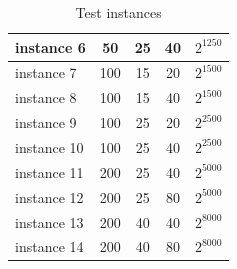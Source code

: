 \documentclass[10pt,journal,compsoc]{IEEEtran}
\newcommand\Tstrut{\rule{0pt}{2.6ex}}
\begin{document}
\begin{table}[h]
{\begin{tabular}{l|c|c|c|c}
instance 6  & 50                                                                             & 25                                                                                        & 40 & $2^{1250}$ \Tstrut                                                                                  \\ \hline
instance 7  & 100                                                                            & 15                                                                                        & 20 & $2^{1500}$  \Tstrut                                                                                \\ \hline
instance 8  & 100                                                                            & 15                                                                                        & 40& $2^{1500}$  \Tstrut                                                                                \\ \hline
instance 9  & 100                                                                            & 25                                                                                        & 20 & $2^{2500}$ \Tstrut                                                                                 \\ \hline
instance 10 & 100                                                                            & 25                                                                                        & 40 & $2^{2500}$  \Tstrut                                                                                \\ \hline
instance 11 & 200                                                                            & 25                                                                                        & 40 & $2^{5000}$  \Tstrut                                                                                \\ \hline
instance 12 & 200                                                                            & 25                                                                                        & 80& $2^{5000}$    \Tstrut                                                                              \\ \hline
instance 13 & 200                                                                            & 40                                                                                        & 40& $2^{8000}$   \Tstrut                                                                               \\ \hline
instance 14 & 200                                                                            & 40                                                                                        & 80 & $2^{8000}$  \Tstrut                                                                                \\ \hline
\end{tabular}
}
\caption{Test instances}\label{test_instances}
\end{table}
\end{document}
